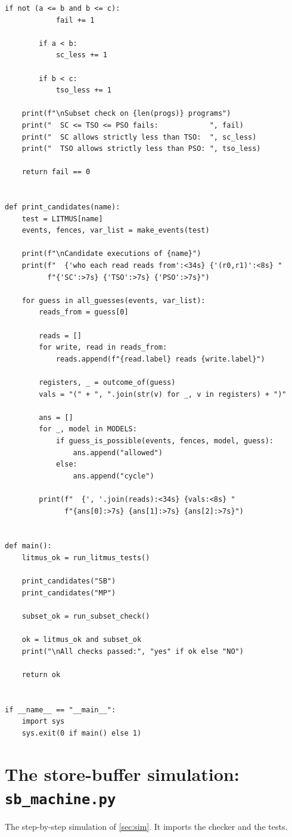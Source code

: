 \begin{lstlisting}[style=vspython]
        if not (a <= b and b <= c):
            fail += 1

        if a < b:
            sc_less += 1

        if b < c:
            tso_less += 1

    print(f"\nSubset check on {len(progs)} programs")
    print("  SC <= TSO <= PSO fails:            ", fail)
    print("  SC allows strictly less than TSO:  ", sc_less)
    print("  TSO allows strictly less than PSO: ", tso_less)

    return fail == 0


def print_candidates(name):
    test = LITMUS[name]
    events, fences, var_list = make_events(test)

    print(f"\nCandidate executions of {name}")
    print(f"  {'who each read reads from':<34s} {'(r0,r1)':<8s} "
          f"{'SC':>7s} {'TSO':>7s} {'PSO':>7s}")

    for guess in all_guesses(events, var_list):
        reads_from = guess[0]

        reads = []
        for write, read in reads_from:
            reads.append(f"{read.label} reads {write.label}")

        registers, _ = outcome_of(guess)
        vals = "(" + ", ".join(str(v) for _, v in registers) + ")"

        ans = []
        for _, model in MODELS:
            if guess_is_possible(events, fences, model, guess):
                ans.append("allowed")
            else:
                ans.append("cycle")

        print(f"  {', '.join(reads):<34s} {vals:<8s} "
              f"{ans[0]:>7s} {ans[1]:>7s} {ans[2]:>7s}")


def main():
    litmus_ok = run_litmus_tests()

    print_candidates("SB")
    print_candidates("MP")

    subset_ok = run_subset_check()

    ok = litmus_ok and subset_ok
    print("\nAll checks passed:", "yes" if ok else "NO")

    return ok


if __name__ == "__main__":
    import sys
    sys.exit(0 if main() else 1)
\end{lstlisting}

\section{The store-buffer simulation: \texttt{sb\_machine.py}}
The step-by-step simulation of \cref{sec:sim}. It imports the checker and the tests.

